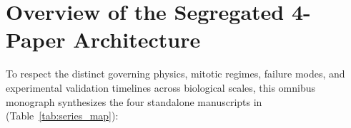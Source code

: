 \documentclass[11pt]{article}
\begin{document}
\begin{abstract}
\cite{hoeffding1963probability}, Huberized $H_\infty$ Kalman estimation \cite{kalman1960new,huber1964robust}, and $32\text{-byte}$ L1 DTCM physical rollback within $< 8\text{ KB}$ SRAM ($4.05\text{ mW}$).
\end{abstract}

\section{Overview of the Segregated 4-Paper Architecture}

To respect the distinct governing physics, mitotic regimes, failure modes, and experimental validation timelines across biological scales, this omnibus monograph synthesizes the four standalone manuscripts in  (Table~\ref{tab:series_map}):
\end{document}
